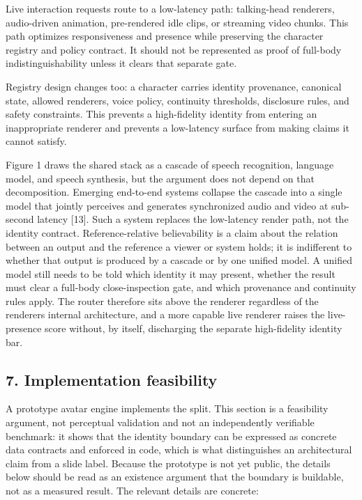 \documentclass[
]{article}
\begin{document}
Live interaction requests route to a low-latency path: talking-head
renderers, audio-driven animation, pre-rendered idle clips, or streaming
video chunks. This path optimizes responsiveness and presence while
preserving the character registry and policy contract. It should not be
represented as proof of full-body indistinguishability unless it clears
that separate gate.

Registry design changes too: a character carries identity provenance,
canonical state, allowed renderers, voice policy, continuity thresholds,
disclosure rules, and safety constraints. This prevents a high-fidelity
identity from entering an inappropriate renderer and prevents a
low-latency surface from making claims it cannot satisfy.

Figure 1 draws the shared stack as a cascade of speech recognition,
language model, and speech synthesis, but the argument does not depend
on that decomposition. Emerging end-to-end systems collapse the cascade
into a single model that jointly perceives and generates synchronized
audio and video at sub-second latency {[}13{]}. Such a system replaces
the low-latency render path, not the identity contract.
Reference-relative believability is a claim about the relation between
an output and the reference a viewer or system holds; it is indifferent
to whether that output is produced by a cascade or by one unified model.
A unified model still needs to be told which identity it may present,
whether the result must clear a full-body close-inspection gate, and
which provenance and continuity rules apply. The router therefore sits
above the renderer regardless of the renderer\textquotesingle s internal
architecture, and a more capable live renderer raises the live-presence
score without, by itself, discharging the separate high-fidelity
identity bar.

\subsection{7. Implementation
feasibility}\label{7-implementation-feasibility}

A prototype avatar engine implements the split. This section is a
feasibility argument, not perceptual validation and not an independently
verifiable benchmark: it shows that the identity boundary can be
expressed as concrete data contracts and enforced in code, which is what
distinguishes an architectural claim from a slide label. Because the
prototype is not yet public, the details below should be read as an
existence argument that the boundary is buildable, not as a measured
result. The relevant details are concrete:
\end{document}

